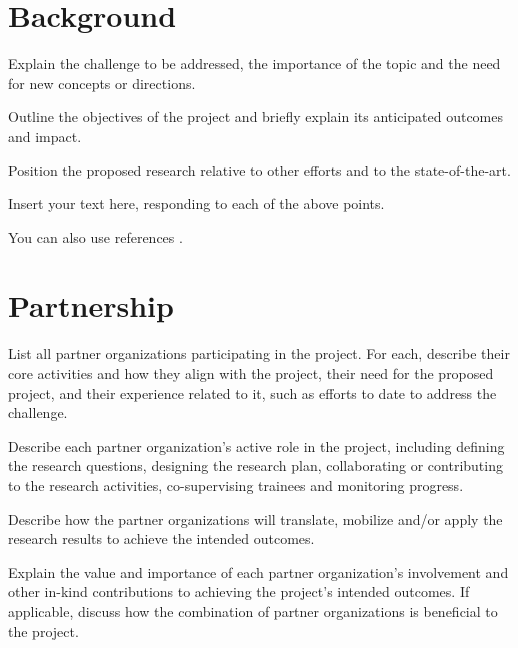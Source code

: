 \documentclass[english]{nserc-alliance}
\begin{document}
\thispagestyle{firstpage}
\maketitle

\section*{Background}
\ifinst\begin{instructions}
  \item Explain the challenge to be addressed, the importance of the topic and the need for new concepts or directions. 
  \item Outline the objectives of the project and briefly explain its anticipated outcomes and impact. 
  \item Position the proposed research relative to other efforts and to the state-of-the-art.
\end{instructions}\fi
  
\noindent Insert your text here, responding to each of the above points. 

You can also use references \cite{DBLPjournals/jsyml/Turing48,DBLPconf/afips/SolomonP76}.

\section*{Partnership}
\ifinst\begin{instructions}
  \item List all partner organizations participating in the project. For each, describe their core activities and how they align with the project, their need for the proposed project, and their experience related to it, such as efforts to date to address the challenge.
  \item	Describe each partner organization's active role in the project, including defining the research questions, designing the research plan, collaborating or contributing to the research activities, co-supervising trainees and monitoring progress.
  \item Describe how the partner organizations will translate, mobilize and/or apply the research results to achieve the intended outcomes. 
  \item Explain the value and importance of each partner organization's involvement and other in-kind contributions to achieving the project's intended outcomes. If applicable, discuss how the combination of partner organizations is beneficial to the project. 
\end{instructions}\fi
  
\end{document}
